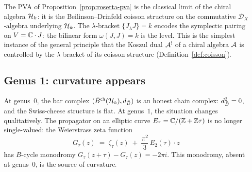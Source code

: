 \begin{remark}
\label{rem:rosetta-coisson}
The PVA of Proposition~\ref{prop:rosetta-pva} is the classical
limit of the chiral algebra $\mathcal{H}_k$: it is the Beilinson--Drinfeld
coisson structure on the commutative $\mathcal{D}_X$-algebra
underlying $\mathcal{H}_k$.  The $\lambda$-bracket $\{J_\lambda J\} = k$
encodes the symplectic pairing on $V = \mathbb{C} \cdot J$: the bilinear
form $\omega(J, J) = k$ is the level.  This is the simplest
instance of the general principle that the Koszul dual
$\mathcal{A}^!$ of a chiral algebra $\mathcal{A}$ is controlled by the
$\lambda$-bracket of its coisson structure
(Definition~\ref{def:coisson}).
\end{remark}


\subsection{Genus 1: curvature appears}
\label{subsec:rosetta-genus1}

At genus~$0$, the bar complex $(\bar{B}^{\mathrm{ch}}(\mathcal{H}_k),
d_{\bar{B}})$ is an honest chain complex: $d_{\bar{B}}^2 = 0$,
and the Swiss-cheese structure is flat.  At genus~$1$, the
situation changes qualitatively.  The propagator on an elliptic
curve $E_\tau = \mathbb{C} / (\mathbb{Z} + \mathbb{Z}\tau)$ is no longer single-valued:
the Weierstrass zeta function
\begin{equation}\label{eq:rosetta-elliptic-propagator}
G_\tau(z)
\;=\;
\zeta_\tau(z) \;+\; \frac{\pi^2}{3}\, E_2(\tau) \cdot z
\end{equation}
has $B$-cycle monodromy $G_\tau(z + \tau) - G_\tau(z) = -2\pi i$.
This monodromy, absent at genus~$0$, is the source of curvature.

